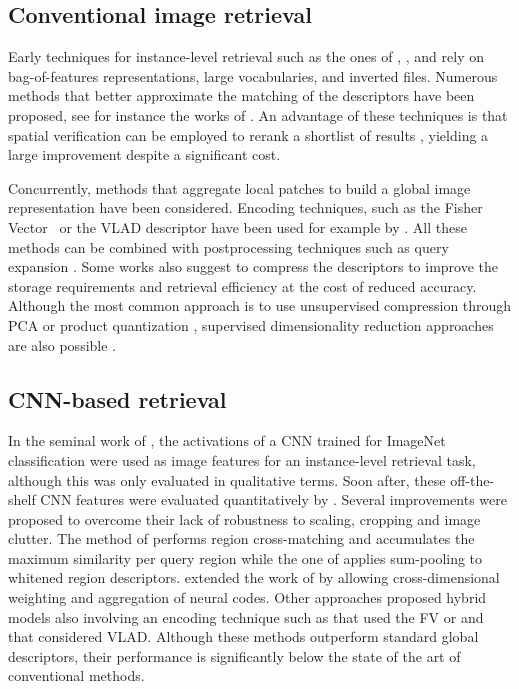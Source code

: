 \documentclass[twocolumn]{svjour3}          \smartqed  \usepackage{graphicx}
\begin{document}
\subsection{Conventional image retrieval} 
Early techniques for instance-level retrieval such as the ones of
\cite{Sivic2003}, \cite{Nister2006}, and \cite{Philbin2007} rely on bag-of-features representations,
large vocabularies, and inverted files. Numerous methods that better
approximate the matching of the descriptors have been proposed, see
for instance the works of \cite{Jegou2008,Jegou2010,Mikulik2013,Tolias2015}.  An advantage of these
techniques is that spatial verification can be employed to rerank a
shortlist of results \citep{Philbin2007,Perdoch2009}, yielding a
large improvement despite a significant cost.

Concurrently, methods that aggregate local patches to build a global image representation have been considered. Encoding techniques, such as the
Fisher Vector~\citep{Perronnin2007,Perronnin2010} or the VLAD descriptor \citep{Jegou2010aggregating} have been used for example by \cite{Perronnin2010, Gordo2012, Jegou2012,Radenovic2015}.
All these methods can be combined with postprocessing techniques such as query expansion \citep{Chum2007,Chum2011,Arandjelovic2012three}.
Some works also suggest to compress the descriptors to improve the storage requirements and retrieval efficiency at the cost of reduced accuracy. 
Although the most common approach is to use unsupervised compression through PCA or product quantization \citep{Perronnin2010,Jegou2012,Radenovic2015}, supervised dimensionality reduction approaches are also possible \citep{Gordo2012}.


\subsection{CNN-based retrieval} In the seminal work of \cite{Krizhevsky2012}, the activations of a CNN trained for ImageNet classification were used as image features for an instance-level retrieval task, although this was only evaluated in qualitative terms.
Soon after, these off-the-shelf CNN features were evaluated quantitatively by \cite{Razavian2014}.
 Several improvements were proposed
to overcome their lack of robustness to scaling, cropping and image clutter. The method of \cite{Razavian2014} performs
region cross-matching and accumulates the maximum similarity per query region while the one of \cite{Babenko2015} applies sum-pooling
to whitened region descriptors. 
\cite{Kalantidis2016} extended the work of \cite{Babenko2015} by allowing cross-dimensional
weighting and aggregation of neural codes. Other approaches proposed hybrid models also involving an encoding technique such
as \cite{Perronnin2015} that used the FV or \cite{Gong2014} and \cite{Paulin2015} that considered VLAD.
Although these methods outperform standard
global descriptors, their performance is significantly below the state of the art of conventional methods.
\end{document}
